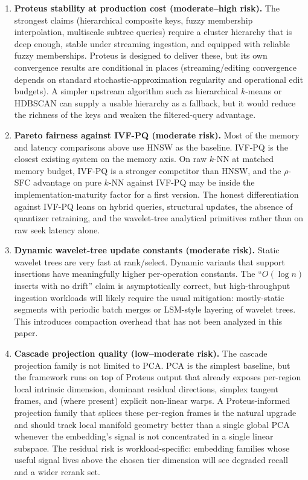 \documentclass[11pt]{article}
\begin{document}
\begin{enumerate}[leftmargin=1.5em]
    \item \textbf{Proteus stability at production cost (moderate--high risk).} The strongest claims (hierarchical composite keys, fuzzy membership interpolation, multiscale subtree queries) require a cluster hierarchy that is deep enough, stable under streaming ingestion, and equipped with reliable fuzzy memberships. Proteus is designed to deliver these, but its own convergence results are conditional in places (streaming/editing convergence depends on standard stochastic-approximation regularity and operational edit budgets). A simpler upstream algorithm such as hierarchical $k$-means or HDBSCAN can supply a usable hierarchy as a fallback, but it would reduce the richness of the keys and weaken the filtered-query advantage.

    \item \textbf{Pareto fairness against IVF-PQ (moderate risk).} Most of the memory and latency comparisons above use HNSW as the baseline. IVF-PQ is the closest existing system on the memory axis. On raw $k$-NN at matched memory budget, IVF-PQ is a stronger competitor than HNSW, and the $\rho$-SFC advantage on pure $k$-NN against IVF-PQ may be inside the implementation-maturity factor for a first version. The honest differentiation against IVF-PQ leans on hybrid queries, structural updates, the absence of quantizer retraining, and the wavelet-tree analytical primitives rather than on raw seek latency alone.

    \item \textbf{Dynamic wavelet-tree update constants (moderate risk).} Static wavelet trees are very fast at rank/select. Dynamic variants that support insertions have meaningfully higher per-operation constants. The ``$O(\log n)$ inserts with no drift'' claim is asymptotically correct, but high-throughput ingestion workloads will likely require the usual mitigation: mostly-static segments with periodic batch merges or LSM-style layering of wavelet trees. This introduces compaction overhead that has not been analyzed in this paper.

    \item \textbf{Cascade projection quality (low--moderate risk).} The cascade projection family is not limited to PCA. PCA is the simplest baseline, but the framework runs on top of Proteus output that already exposes per-region local intrinsic dimension, dominant residual directions, simplex tangent frames, and (where present) explicit non-linear warps. A Proteus-informed projection family that splices these per-region frames is the natural upgrade and should track local manifold geometry better than a single global PCA whenever the embedding's signal is not concentrated in a single linear subspace. The residual risk is workload-specific: embedding families whose useful signal lives above the chosen tier dimension will see degraded recall and a wider rerank set.


\end{enumerate}
\end{document}
